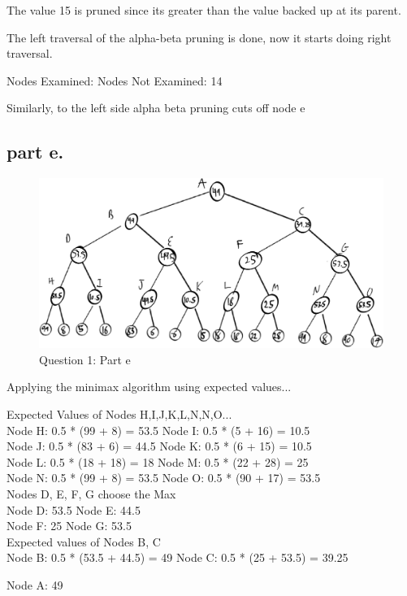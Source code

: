 The value 15 is pruned since its greater than the value backed up at its parent.

The left traversal of the alpha-beta pruning is done, now it starts doing right traversal.

Nodes Examined:
Nodes Not Examined: 14

Similarly, to the left side alpha beta pruning cuts off node e

\subsection{part e.}

\begin{figure}[H]
	\centering
  \includegraphics[scale = 0.70]{q1_part_e.png}
	\caption{Question 1: Part e}
	\label{fig: Q1 Part e}
\end{figure}

Applying the minimax algorithm using expected values...

\begin{center}
Expected Values of Nodes H,I,J,K,L,N,N,O... \\
Node H: 0.5 * (99 + 8)  = 53.5 \tab \tab
Node I: 0.5 * (5 + 16)  = 10.5 \\
Node J: 0.5 * (83 + 6)  = 44.5 \tab \tab
Node K: 0.5 * (6 + 15)  = 10.5 \\
Node L: 0.5 * (18 + 18) = 18   \tab \tab
Node M: 0.5 * (22 + 28) = 25   \\
Node N: 0.5 * (99 + 8)  = 53.5 \tab \tab
Node O: 0.5 * (90 + 17) = 53.5 \\

\newpage
Nodes D, E, F, G choose the Max \\
Node D: 53.5 \tab \tab
Node E: 44.5 \\
Node F: 25   \tab \tab
Node G: 53.5 \\

Expected values of Nodes B, C \\
Node B: 0.5 * (53.5 + 44.5) = 49 \tab \tab
Node C: 0.5 * (25 + 53.5)   = 39.25

Node A: 49
\end{center}

